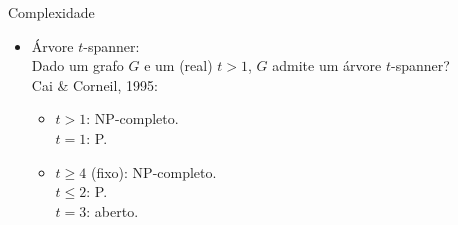 \documentclass[dvipsnames]{beamer}
\begin{document}



\begin{frame}{Complexidade}
  \begin{itemize}
  \item Árvore $t$-spanner:\\
    Dado um grafo $G$ e um (real) $t > 1$, $G$ admite um árvore $t$-spanner?\\
      Cai \& Corneil, 1995:\\
      \begin{itemize}
        \item {$t > 1$: NP-completo.}\\
          {\makebox[3.3cm]{\hfill}$t = 1$: P.}
        \item {$t \ge 4$ (fixo): NP-completo.}\\
          {\makebox[3.3cm]{\hfill}$t \le 2$: P.}\\
          {\makebox[3.3cm]{\hfill}$t = 3$: aberto.}\\
      \end{itemize}
  \end{itemize}
\end{frame}
\end{document}
